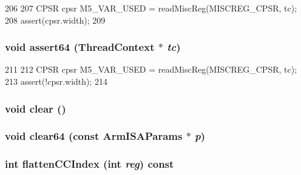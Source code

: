 \begin{DoxyCode}
206                                                 {
207             CPSR cpsr M5_VAR_USED = readMiscReg(MISCREG_CPSR, tc);
208             assert(cpsr.width);
209         }
\end{DoxyCode}
\hypertarget{structArmISA_1_1ISA_aad0b8ae6c31a34244ccf43b9202b40eb}{
\subsubsection[{assert64}]{\setlength{\rightskip}{0pt plus 5cm}void assert64 ({\bf ThreadContext} $\ast$ {\em tc})}}
\label{structArmISA_1_1ISA_aad0b8ae6c31a34244ccf43b9202b40eb}



\begin{DoxyCode}
211                                                 {
212             CPSR cpsr M5_VAR_USED = readMiscReg(MISCREG_CPSR, tc);
213             assert(!cpsr.width);
214         }
\end{DoxyCode}
\hypertarget{structArmISA_1_1ISA_ac8bb3912a3ce86b15842e79d0b421204}{
\subsubsection[{clear}]{\setlength{\rightskip}{0pt plus 5cm}void clear ()}}
\label{structArmISA_1_1ISA_ac8bb3912a3ce86b15842e79d0b421204}
\hypertarget{structArmISA_1_1ISA_acfe5434ce5ff7f87e2ce263d3ac51c24}{
\subsubsection[{clear64}]{\setlength{\rightskip}{0pt plus 5cm}void clear64 (const ArmISAParams $\ast$ {\em p})}}
\label{structArmISA_1_1ISA_acfe5434ce5ff7f87e2ce263d3ac51c24}
\hypertarget{structArmISA_1_1ISA_a7a5d7476bd10e5af09e6e753d1fca087}{
\subsubsection[{flattenCCIndex}]{\setlength{\rightskip}{0pt plus 5cm}int flattenCCIndex (int {\em reg}) const}}
\label{structArmISA_1_1ISA_a7a5d7476bd10e5af09e6e753d1fca087}



